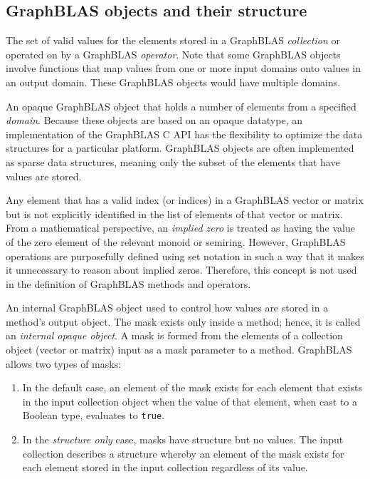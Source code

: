 
\subsection{GraphBLAS objects and their structure}

\glossBegin
{} The set of valid values for the elements stored in a 
GraphBLAS \emph{collection} or operated on by a GraphBLAS \emph{operator}.
Note that some GraphBLAS objects involve functions that map values from 
one or more input domains onto values in an output domain.  These GraphBLAS 
objects would have multiple domains.

 An opaque GraphBLAS object that holds a number of
elements from a specified \emph{domain}. Because these objects are based on an 
opaque datatype, an implementation of the GraphBLAS C API has the flexibility 
to optimize the data structures for a particular platform.  GraphBLAS objects 
are often implemented as sparse data structures, meaning only the subset of the
elements that have values are stored.

  Any element that has a valid index (or indices) 
in a GraphBLAS vector or matrix but is not explicitly identified in the list of 
elements of that vector or matrix. From a mathematical perspective, an
\emph{implied zero} is treated as having the 
value of the zero element of the relevant monoid or semiring.
However, GraphBLAS operations are purposefully defined using set notation in such a way
that it makes it unnecessary to reason about implied zeros. 
Therefore, this concept is not used in the definition of GraphBLAS methods and operators.

 An internal GraphBLAS object used to control how values 
are stored in a method's output object.  The mask exists only inside a method; hence,
it is called an \emph{internal opaque object}.  A mask is formed from the elements of
a collection object (vector or matrix) input as a mask parameter to a method. GraphBLAS 
allows two types of masks:
\begin{enumerate}
\item In the default 
case, an element of the mask exists for each element that exists in the 
input collection object when the value of that element, when cast to a Boolean type, evaluates to 
{\tt true}.  
\item In the {\it structure only} case, masks have structure but no values. 
The input collection describes a structure whereby an 
element of the mask exists for each element stored in the input collection regardless of its value.
\end{enumerate}

